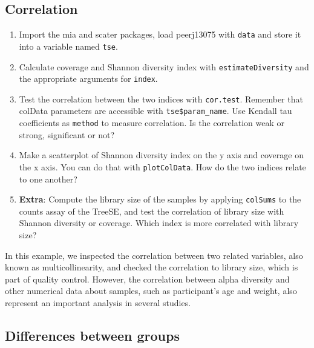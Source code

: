 \documentclass[
]{book}
\providecommand{\tightlist}{%
  \setlength{\itemsep}{0pt}\setlength{\parskip}{0pt}}
\begin{document}
\hypertarget{correlation}{%
\subsection{Correlation}\label{correlation}}

\begin{enumerate}
\def\labelenumi{\arabic{enumi}.}
\tightlist
\item
  Import the mia and scater packages, load peerj13075 with \texttt{data} and store it
  into a variable named \texttt{tse}.
\item
  Calculate coverage and Shannon diversity index with \texttt{estimateDiversity} and
  the appropriate arguments for \texttt{index}.
\item
  Test the correlation between the two indices with \texttt{cor.test}. Remember that
  colData parameters are accessible with \texttt{tse\$param\_name}. Use Kendall tau
  coefficients as \texttt{method} to measure correlation. Is the correlation
  weak or strong, significant or not?
\item
  Make a scatterplot of Shannon diversity index on the y axis and coverage on
  the x axis. You can do that with \texttt{plotColData}. How do the two indices
  relate to one another?
\item
  \textbf{Extra}: Compute the library size of the samples by applying \texttt{colSums} to
  the counts assay of the TreeSE, and test the correlation of library size with
  Shannon diversity or coverage. Which index is more correlated with library size?
\end{enumerate}

In this example, we inspected the correlation between two related variables,
also known as multicollinearity, and checked the correlation to library size,
which is part of quality control. However, the correlation between alpha diversity
and other numerical data about samples, such as participant's age and weight, also
represent an important analysis in several studies.

\hypertarget{differences-between-groups}{%
\subsection{Differences between groups}\label{differences-between-groups}}
\end{document}
